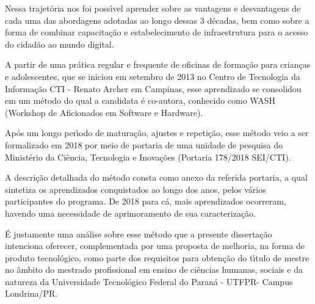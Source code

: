 \documentclass[
12pt,		%
openright,	%
twoside,  %
a4paper,			%
chapter=TITLE,		%
english,			%
french,				%
spanish,			%
brazil				%
]{USPSC-classe/USPSC}
\begin{document}
Nessa trajet\'oria nos foi poss\'{\i}vel aprender sobre as vantagens e desvantagens de cada uma das abordagens adotadas ao longo dessas 3 d\'ecadas, bem como sobre a forma de combinar capacita\c{c}\~ao e estabelecimento de infraestrutura para o acesso do cidad\~ao ao mundo digital.










A partir de uma pr\'atica regular e frequente de oficinas de forma\c{c}\~ao para  crian\c{c}as e adolescentes, que se iniciou em setembro de 2013 no Centro de Tecnologia da Informa\c{c}\~ao CTI - Renato Archer em Campinas, esse aprendizado se consolidou em um m\'etodo do qual a candidata \'e co-autora, conhecido como WASH (Workshop de Aficionados em Software e Hardware).










Ap\'os um longo per\'{\i}odo de matura\c{c}\~ao, ajustes e repeti\c{c}\~ao, esse m\'etodo veio a ser formalizado em 2018 por meio de portaria de uma unidade de pesquisa do Minist\'erio da Ci\^encia, Tecnologia e Inova\c{c}\~oes (Portaria 178/2018 SEI/CTI).










A descri\c{c}\~ao detalhada do m\'etodo consta como anexo da referida portaria, a qual sintetiza os aprendizados conquistados ao longo dos anos, pelos v\'arios participantes do programa. De 2018 para c\'a, mais aprendizados ocorreram, havendo uma necessidade de aprimoramento de sua caracteriza\c{c}\~ao.










\'E justamente uma an\'alise sobre esse m\'etodo que a presente disserta\c{c}\~ao intenciona oferecer, complementada por uma proposta de melhoria, na forma de produto tecnol\'ogico, como parte dos requisitos para obten\c{c}\~ao do t\'{\i}tulo de mestre no \^ambito do mestrado profissional em ensino de ci\^encias humanas, sociais e da natureza da Universidade  Tecnol\'ogico  Federal do Paran\'a - UTFPR- Campus Londrina/PR.
\end{document}
